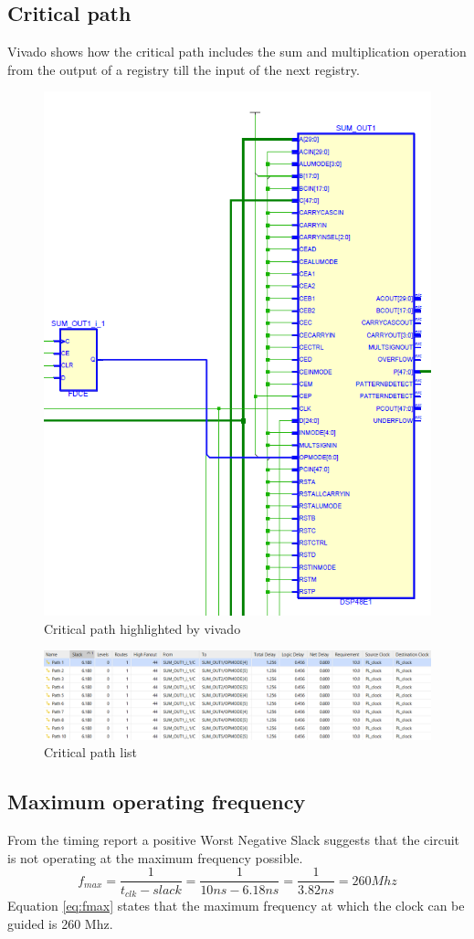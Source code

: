 \subsection{Critical path} %
\label{sub:critical_path}
Vivado shows how the critical path includes the sum and multiplication operation from the output of a registry till the input of the next registry.
  \begin{figure}[H]
   \centering
   \includegraphics[width=0.5\linewidth]{./images/critical}
   \caption{Critical path highlighted by vivado}
   \label{fig:critical}
  \end{figure}
  \begin{figure}[H]
   \centering
   \includegraphics[width=1\linewidth]{./images/crit_list}
   \caption{Critical path list}
   \label{fig:crit_list}
  \end{figure}
  
\subsection{Maximum operating frequency} %
\label{sub:maximum_operating_frequency}
From the timing report a positive Worst Negative Slack suggests that the circuit is not operating at the maximum frequency possible.
\begin{equation}
	\label{eq:fmax}
	f_{max} = \frac{1}{t_{clk}-slack}=\frac{1}{10ns-6.18ns}= \frac{1}{3.82ns}= 260 Mhz
\end{equation}
Equation \ref{eq:fmax} states that the maximum frequency at which the clock can be guided is 260 Mhz.

